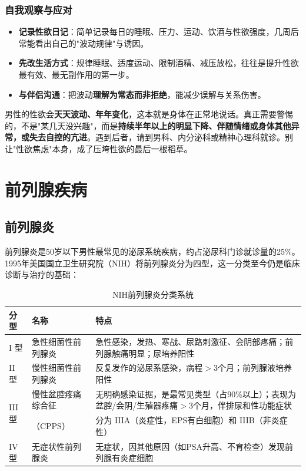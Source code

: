 \documentclass[12pt,a4paper,twoside]{ctexbook}
\begin{document}
\subsection{自我观察与应对}

\begin{itemize}
	\item \textbf{记录性欲日记}：简单记录每日的睡眠、压力、运动、饮酒与性欲强度，几周后常能看出自己的"波动规律"与诱因。
	\item \textbf{先改生活方式}：规律睡眠、适度运动、限制酒精、减压放松，往往是提升性欲最有效、最无副作用的第一步。
	\item \textbf{与伴侣沟通}：把波动\textbf{理解为常态而非拒绝}，能减少误解与关系伤害。
\end{itemize}

\begin{tcolorbox}[colback=blue!5!white,colframe=blue!50!black,title=贴心小叮咛]
男性的性欲会\textbf{天天波动、年年变化}，这本就是身体在正常地说话。真正需要警惕的，不是"某几天没兴趣"，而是\textbf{持续半年以上的明显下降、伴随情绪或身体其他异常，或失去自控的亢进}。遇到后者，请到男科、内分泌科或精神心理科就诊。别让"性欲焦虑"本身，成了压垮性欲的最后一根稻草。
\end{tcolorbox}

\chapter{前列腺疾病}

\section{前列腺炎}

前列腺炎是50岁以下男性最常见的泌尿系统疾病，约占泌尿科门诊就诊量的25\%。1995年美国国立卫生研究院（NIH）将前列腺炎分为四型，这一分类至今仍是临床诊断与治疗的基础：

\begin{table}[htbp]
\centering
\caption{NIH前列腺炎分类系统}
\label{tab:prostatitis_nih}
\begin{tabularx}{\textwidth}{@{}llX@{}}
    \toprule
    \textbf{分型} & \textbf{名称} & \textbf{特点} \\
    \midrule
    I 型 & 急性细菌性前列腺炎 & 急性感染，发热、寒战、尿路刺激征、会阴部疼痛；前列腺触痛明显；尿培养阳性 \\
    II 型 & 慢性细菌性前列腺炎 & 反复发作的泌尿系感染，病程$>$3个月；前列腺液培养阳性 \\
    \multirow{2}{*}{III 型} & 慢性盆腔疼痛综合征 & 无明确感染证据，是最常见类型（占90\%以上）；表现为盆腔/会阴/生殖器疼痛$>$3个月，伴排尿和性功能症状 \\
     & （CPPS） & 分为 IIIA（炎症性，EPS有白细胞）和 IIIB（非炎症性） \\
    IV 型 & 无症状性前列腺炎 & 无症状，因其他原因（如PSA升高、不育检查）发现前列腺有炎症细胞 \\
    \bottomrule
\end{tabularx}
\end{table}
\end{document}
